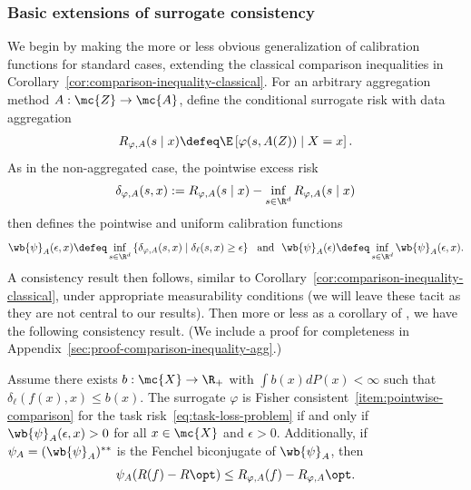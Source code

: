 \documentclass[11pt]{article}
\newcommand{\brk}[1]{\left[{#1}\right]} %
\newcommand{\tloss}{\ell}  %
\newcommand{\sloss}{\varphi}  %
\newcommand{\extloss}{\delta_\tloss}
\newcommand{\exslossagg}{\delta_{\sloss,A}}
\begin{document}
\subsubsection{Basic extensions of surrogate consistency}

We begin by making the more or less obvious generalization
of calibration functions for standard cases, extending
the classical comparison
inequalities in Corollary~\ref{cor:comparison-inequality-classical}.
%
For an arbitrary aggregation method $A : \mc{Z} \to \mc{A}$, define the
conditional surrogate risk with data aggregation
\begin{align*}
  R_{\sloss,A}(s\mid x) \defeq \E\brk{\sloss(s, A(Z)) \mid X = x}.
\end{align*}
As in the non-aggregated case, the pointwise excess risk
\begin{align*}
  \exslossagg (s,x) := R_{\sloss,A}(s\mid x)
  - \inf_{s \in \R^d} R_{\sloss,A}(s\mid x)
\end{align*}
then defines the pointwise and uniform calibration functions
\begin{equation}
  \label{eqn:pointwise-agg-calibration}
  \wb{\psi}_A(\epsilon, x) \defeq \inf_{s \in \R^d}
  \left\{\exslossagg(s, x) \mid \extloss(s, x) \geq \epsilon\right\}
  ~~ \mbox{and} ~~
  \wb{\psi}_A(\epsilon) \defeq \inf_{s \in \R^d} \wb{\psi}_A(\epsilon, x).
\end{equation}
A consistency result then follows, similar to
Corollary~\ref{cor:comparison-inequality-classical}, under appropriate
measurability conditions (we will leave these tacit as they are not central
to our results).
%
Then more or less as a corollary of \citet[Thm.~2.8]{Steinwart07}, we have
the following consistency result.
%
(We include a proof for completeness in
Appendix~\ref{sec:proof-comparison-inequality-agg}.)

\begin{proposition}
  \label{prop:comparison-inequality-agg}
  Assume there exists $b : \mc{X} \to \R_+$ with
  $\int b(x) dP(x) < \infty$ such that
  $\extloss(f(x), x) \le b(x)$.
  The surrogate $\sloss$ is Fisher consistent~\eqref{item:pointwise-comparison}
  for the task risk~\eqref{eq:task-loss-problem}
  if and only if $\wb{\psi}_A(\epsilon, x) > 0$ for all $x \in \mc{X}$
  and $\epsilon > 0$.
  Additionally, if $\psi_A = (\wb{\psi}_A)^{**}$ is the Fenchel
  biconjugate of $\wb{\psi}_A$,
  then
  \begin{align*}
    \psi_A(R(f) - R\opt) \leq R_{\sloss,A}(f) - R_{\sloss,A}\opt.
  \end{align*}
\end{proposition}
\end{document}

